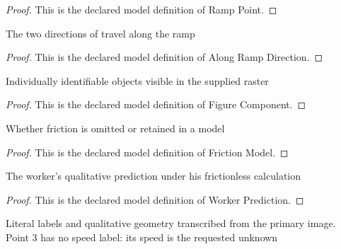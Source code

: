 \begin{proof}
  This is the declared model definition of Ramp Point.
\end{proof}
\begin{definition}
  \label{def:physics:phyx-mini-0812:phyxminiproblems-problemphyxmini0812-alongrampdirection}
  The two directions of travel along the ramp
\end{definition}
\begin{proof}
  This is the declared model definition of Along Ramp Direction.
\end{proof}
\begin{definition}
  \label{def:physics:phyx-mini-0812:phyxminiproblems-problemphyxmini0812-figurecomponent}
  Individually identifiable objects visible in the supplied raster
\end{definition}
\begin{proof}
  This is the declared model definition of Figure Component.
\end{proof}
\begin{definition}
  \label{def:physics:phyx-mini-0812:phyxminiproblems-problemphyxmini0812-frictionmodel}
  Whether friction is omitted or retained in a model
\end{definition}
\begin{proof}
  This is the declared model definition of Friction Model.
\end{proof}
\begin{definition}
  \label{def:physics:phyx-mini-0812:phyxminiproblems-problemphyxmini0812-workerprediction}
  The worker's qualitative prediction under his frictionless calculation
\end{definition}
\begin{proof}
  This is the declared model definition of Worker Prediction.
\end{proof}
\begin{definition}
  \label{def:physics:phyx-mini-0812:phyxminiproblems-problemphyxmini0812-rampfigure}
  Literal labels and qualitative geometry transcribed from the primary image. Point 3 has no speed label: its speed is the requested unknown
\end{definition}
